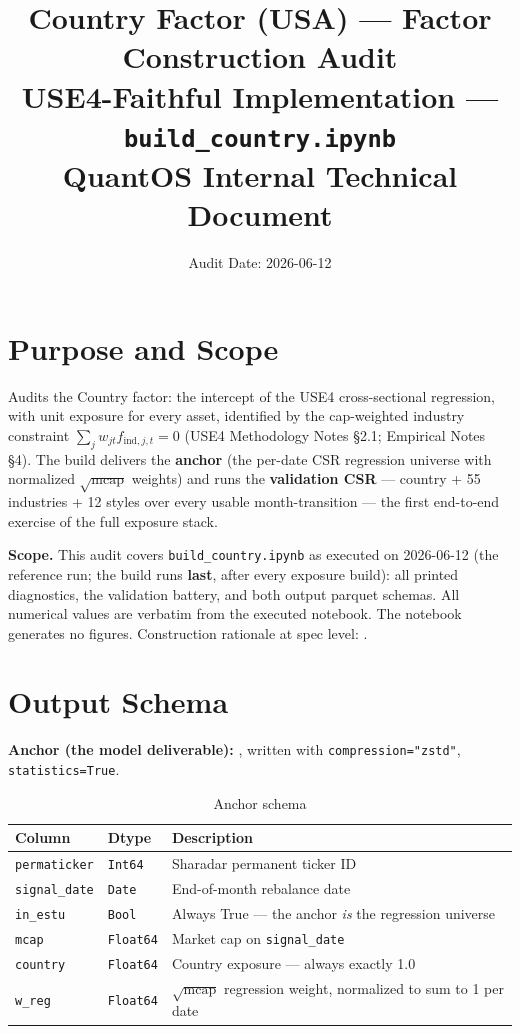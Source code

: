 \documentclass[11pt,a4paper]{article}
\title{\textbf{Country Factor (USA) --- Factor Construction Audit}\\[2pt]
\large USE4-Faithful Implementation --- \texttt{build\_country.ipynb}\\[4pt]
\normalsize QuantOS Internal Technical Document}
\author{Audit Date: 2026-06-12}
\date{}
\begin{document}
\maketitle
\tableofcontents
\newpage

\section{Purpose and Scope}

Audits the Country factor: the intercept of the USE4 cross-sectional
regression, with unit exposure for every asset, identified by the
cap-weighted industry constraint $\sum_j w_{jt} f_{\text{ind},j,t} = 0$ (USE4
Methodology Notes \S2.1; Empirical Notes \S4). The build delivers the
\textbf{anchor} (the per-date CSR regression universe with normalized
$\sqrt{\text{mcap}}$ weights) and runs the \textbf{validation CSR} ---
country + 55 industries + 12 styles over every usable month-transition ---
the first end-to-end exercise of the full exposure stack.

\smallskip
\textbf{Scope.} This audit covers \texttt{build\_country.ipynb} as executed on
2026-06-12 (the reference run; the build runs \textbf{last}, after every
exposure build): all printed
diagnostics, the validation battery, and both output parquet schemas. All
numerical values are verbatim from the executed notebook. The notebook
generates no figures. Construction rationale at spec level:
.

\section{Output Schema}

\textbf{Anchor (the model deliverable):} ,
written with \texttt{compression="zstd"}, \newline\texttt{statistics=True}.

\begin{table}[h!]
\centering
\caption{Anchor schema}
\begin{tabular}{llp{7.4cm}}
\toprule
\textbf{Column} & \textbf{Dtype} & \textbf{Description} \\
\midrule
\texttt{permaticker} & \texttt{Int64} & Sharadar permanent ticker ID \\
\texttt{signal\_date} & \texttt{Date} & End-of-month rebalance date \\
\texttt{in\_estu} & \texttt{Bool} & Always True --- the anchor \emph{is} the regression universe \\
\texttt{mcap} & \texttt{Float64} & Market cap on \texttt{signal\_date} \\
\texttt{country} & \texttt{Float64} & Country exposure --- always exactly 1.0 \\
\texttt{w\_reg} & \texttt{Float64} & $\sqrt{\text{mcap}}$ regression weight, normalized to sum to 1 per date \\
\bottomrule
\end{tabular}
\end{table}
\end{document}
